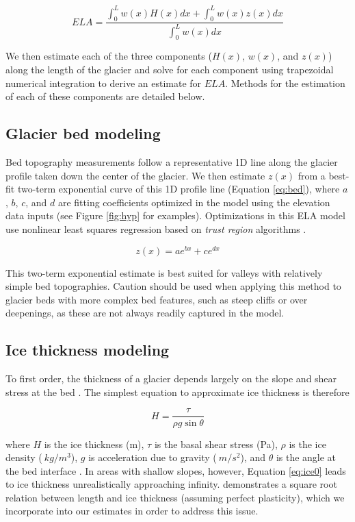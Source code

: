\documentclass[review]{elsarticle}
\begin{document}
\begin{equation}
\label{eq:ela}
ELA = \frac{\int_0^L w(x) H(x)dx + \int_0^L w(x) z(x)dx}{\int_0^L w(x) dx}
\end{equation}

We then estimate each of the three components ($H(x)$, $w(x)$, and $z(x)$) along the length of the glacier and solve for each component using trapezoidal numerical integration to derive an estimate for $ELA$.
Methods for the estimation of each of these components are detailed below.

\subsection{Glacier bed modeling}

Bed topography measurements follow a representative 1D line along the glacier profile taken down the center of the glacier.
We then estimate $z(x)$ from a best-fit two-term exponential curve of this 1D profile line (Equation \ref{eq:bed}), where $a$, $b$, $c$, and $d$ are fitting coefficients optimized in the model using the elevation data inputs (see Figure \ref{fig:hyp} for examples).
Optimizations in this ELA model use nonlinear least squares regression based on \textit{trust region} algorithms \cite{more_computing_1983}.

\begin{equation}
\label{eq:bed}
z(x) = ae^{bx} + ce^{dx}
\end{equation}

This two-term exponential estimate is best suited for valleys with relatively simple bed topographies.
Caution should be used when applying this method to glacier beds with more complex bed features, such as steep cliffs or over deepenings, as these are not always readily captured in the model.

\subsection{Ice thickness modeling}

To first order, the thickness of a glacier depends largely on the slope and shear stress at the bed \cite{cuffey_physics_2010}.
The simplest equation to approximate ice thickness is therefore

\begin{equation}
\label{eq:ice0}
H = \frac{\tau}{\rho g \sin\theta}
\end{equation}

where $H$ is the ice thickness (m), $\tau$ is the basal shear stress (Pa), $\rho$ is the ice density ($\:kg/m^3$), $g$ is acceleration due to gravity ($\:m/s^2$), and $\theta$ is the angle at the bed interface \cite{cuffey_physics_2010}.
In areas with shallow slopes, however, Equation \ref{eq:ice0} leads to ice thickness unrealistically approaching infinity.
\cite{oerlemans_minimal_2008} demonstrates a square root relation between length and ice thickness (assuming perfect plasticity), which we incorporate into our estimates in order to address this issue.
\end{document}
